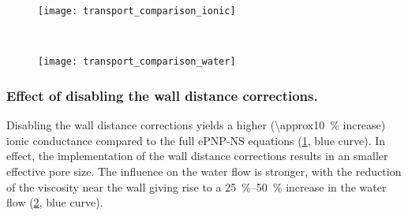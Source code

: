 %
\begin{figure*}[p]
  \centering
  \begin{subfigure}[t]{11.5cm}
    \centering
    \caption{}\vspace{0mm}\label{fig:transport_comparison_ionic}
    \texttt{[image: transport\_comparison\_ionic]}
  \end{subfigure}
  \\
  \begin{subfigure}[t]{11.5cm}
    \centering
    \caption{}\vspace{0mm}\label{fig:transport_comparison_water}
    \texttt{[image: transport\_comparison\_water]}
  \end{subfigure}

  \caption[Effect of individ. corrections on the sim. ionic and water conductance]%
  {%
    \textbf{Effect of individual corrections on the simulated ionic and water conductance.}
    ()
    The ionic conductance $\conductance = \current / \vbias$ and
    ()
    the water conductance $\flowcond = \flowrate / \vbias$ of {ClyA-AS} at \SI{+150}{\mV} (left) and
    \SI{-150}{\mV} (right), normalized over the values of the \gls{epnp-ns} equations. Comparison between the
    experimental data (expt.), the simple resistor model (bulk, \cref{eq:bulk_nanopore_current}), classic
    {PNP-NS} ({sim. PNP-NS}), {ePNP-NS} without wall distance corrections ({sim. ePNP-NS no WDF}:
    $\diffusion_{i}^w=1$, $\mobility_{i}^w=1$, $\viscosity^w=1$), {ePNP-NS} without concentration-dependent
    corrections ({sim. ePNP-NS no CDF}: $\permittivity_{r,\text{f}}^c=1$, $\diffusion_{i}^c=1$,
    $\mobility_{i}^c=1$, $\viscosity^c=1$, $\density^c=1$), {ePNP-NS} without steric effect ({sim. ePNP-NS no
    SMP}: $\vec{\beta}=0$) and full with all corrections enabled ({ePNP-NS}).
  }\label{fig:transport_comparison}
\end{figure*}
%

%
\subsubsection{Effect of disabling the wall distance corrections.}
%

Disabling the wall distance corrections yields a higher (\SI{\approx10}{\percent} increase) ionic conductance
compared to the full {ePNP-NS} equations (\cref{fig:transport_comparison_ionic}, blue curve). In effect, the
implementation of the wall distance corrections results in an smaller effective pore size.  The influence on
the water flow is stronger, with the reduction of the viscosity near the wall giving rise to a
\SIrange{25}{50}{\percent} increase in the water flow (\cref{fig:transport_comparison_water}, blue curve).

